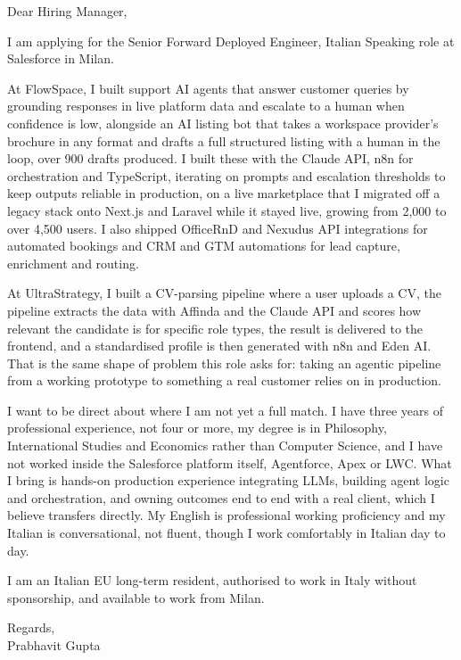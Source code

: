 \documentclass[a4paper,11pt]{article}
\begin{document}
Dear Hiring Manager,

I am applying for the Senior Forward Deployed Engineer, Italian Speaking role at Salesforce in Milan.

At FlowSpace, I built support AI agents that answer customer queries by grounding responses in live platform data and escalate to a human when confidence is low, alongside an AI listing bot that takes a workspace provider's brochure in any format and drafts a full structured listing with a human in the loop, over 900 drafts produced. I built these with the Claude API, n8n for orchestration and TypeScript, iterating on prompts and escalation thresholds to keep outputs reliable in production, on a live marketplace that I migrated off a legacy stack onto Next.js and Laravel while it stayed live, growing from 2,000 to over 4,500 users. I also shipped OfficeRnD and Nexudus API integrations for automated bookings and CRM and GTM automations for lead capture, enrichment and routing.

At UltraStrategy, I built a CV-parsing pipeline where a user uploads a CV, the pipeline extracts the data with Affinda and the Claude API and scores how relevant the candidate is for specific role types, the result is delivered to the frontend, and a standardised profile is then generated with n8n and Eden AI. That is the same shape of problem this role asks for: taking an agentic pipeline from a working prototype to something a real customer relies on in production.

I want to be direct about where I am not yet a full match. I have three years of professional experience, not four or more, my degree is in Philosophy, International Studies and Economics rather than Computer Science, and I have not worked inside the Salesforce platform itself, Agentforce, Apex or LWC. What I bring is hands-on production experience integrating LLMs, building agent logic and orchestration, and owning outcomes end to end with a real client, which I believe transfers directly. My English is professional working proficiency and my Italian is conversational, not fluent, though I work comfortably in Italian day to day.

I am an Italian EU long-term resident, authorised to work in Italy without sponsorship, and available to work from Milan.

Regards,\\
Prabhavit Gupta
\end{document}
